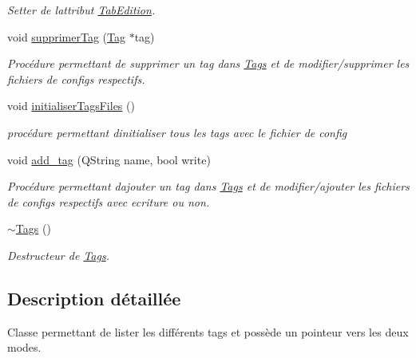 \begin{DoxyCompactItemize}
\begin{DoxyCompactList}\small\item\em Setter de l\textquotesingle{}attribut \hyperlink{class_tab_edition}{Tab\+Edition}. \end{DoxyCompactList}\item 
void \hyperlink{class_tags_a72f68c1babf29e2c5f1e49356dbe71ab}{supprimer\+Tag} (\hyperlink{class_tag}{Tag} $\ast$tag)
\begin{DoxyCompactList}\small\item\em Procédure permettant de supprimer un tag dans \hyperlink{class_tags}{Tags} et de modifier/supprimer les fichiers de configs respectifs. \end{DoxyCompactList}\item 
void \hyperlink{class_tags_ac595bd17429b50a9a4b35f993670b44b}{initialiser\+Tags\+Files} ()\hypertarget{class_tags_ac595bd17429b50a9a4b35f993670b44b}{}\label{class_tags_ac595bd17429b50a9a4b35f993670b44b}

\begin{DoxyCompactList}\small\item\em procédure permettant d\textquotesingle{}initialiser tous les tags avec le fichier de config \end{DoxyCompactList}\item 
void \hyperlink{class_tags_a837588d5b1fa060ecc1c4c37cedbbe16}{add\+\_\+tag} (Q\+String name, bool write)
\begin{DoxyCompactList}\small\item\em Procédure permettant d\textquotesingle{}ajouter un tag dans \hyperlink{class_tags}{Tags} et de modifier/ajouter les fichiers de configs respectifs avec ecriture ou non. \end{DoxyCompactList}\item 
\hyperlink{class_tags_a8fbc021de7f063e0a8f0dc79a8894083}{$\sim$\+Tags} ()\hypertarget{class_tags_a8fbc021de7f063e0a8f0dc79a8894083}{}\label{class_tags_a8fbc021de7f063e0a8f0dc79a8894083}

\begin{DoxyCompactList}\small\item\em Destructeur de \hyperlink{class_tags}{Tags}. \end{DoxyCompactList}\end{DoxyCompactItemize}


\subsection{Description détaillée}
Classe permettant de lister les différents tags et possède un pointeur vers les deux modes. 

